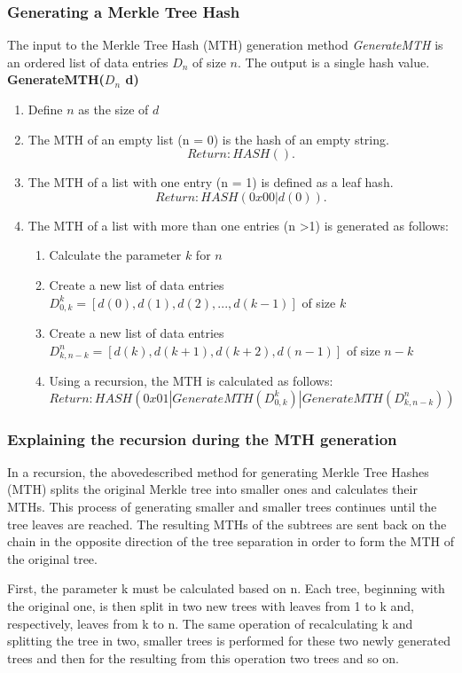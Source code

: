 \documentclass{article}
\begin{document}
		\subsubsection{Generating a Merkle Tree Hash}
		The input to the Merkle Tree Hash (MTH) generation method \textit{GenerateMTH} is an ordered list of data entries  \textit{$ D_{n} $} of size $ n $. The output is a single hash value. \\
		
		\textbf{GenerateMTH(\textit{$ D_{n} $} d)}
		\begin{enumerate}
			\item Define $ n $ as the size of $ d $
			\item The MTH of an empty list (n = 0) is the hash of an empty string. \[Return: HASH().\]
			\item The MTH of a list with one entry (n = 1) is defined as a leaf hash. \[Return: HASH(0x00 | d(0)).\]
			\item The MTH of a list with more than one entries (n \textgreater 1) is generated as follows:
			\begin{enumerate}
				\item Calculate the parameter $ k $ for $ n $
				\item Create a new list of data entries $ D_{0, k}^{k} = [ d(0), d(1), d(2), ..., d(k - 1) ] $ of size $ k $
				\item Create a new list of data entries $ D_{k, n - k}^{n} =  [d(k), d(k+1), d(k+2), d(n - 1) ]$ of size $ n - k $
				\item Using a recursion, the MTH is calculated as follows: \[Return: HASH(0x01 | GenerateMTH( D_{0, k}^{k}) | GenerateMTH(D_{k, n - k}^{n}))\] 
			\end{enumerate}
		\end{enumerate}
		\subsubsection{Explaining the recursion during the MTH generation}
		
		In a recursion, the abovedescribed method for generating Merkle Tree Hashes (MTH) splits the original Merkle tree into smaller ones and calculates their MTHs. This process of generating smaller and smaller trees continues until the tree leaves are reached. The resulting MTHs of the subtrees are sent back on the chain in the opposite direction of the tree separation in order to form the MTH of the original tree. 
		
		First, the parameter k must be calculated based on n. Each tree, beginning with the original one, is then split in two new trees with leaves from 1 to k and, respectively, leaves from k to n. The same operation of recalculating k and splitting the tree in two, smaller trees is performed for these two newly generated trees and then for the resulting from this operation two trees and so on. 
		
\end{document}
